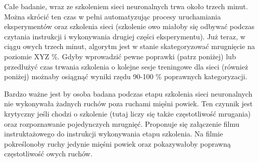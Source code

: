 \documentclass{article}
\begin{document}
        Całe badanie, wraz ze szkoleniem sieci neuronalnych trwa około trzech minut. Można skrócić ten czas w pełni automatyzując procesy uruchamiania eksperymentów oraz szkolenia sieci (szkolenie owo miałoby się odbywać podczas czytania instrukcji i wykonywania drugiej części eksperymentu). Już teraz, w ciągu owych trzech minut, algorytm jest w stanie skategoryzować mrugnięcie na poziomie XYZ \%. Gdyby wprowadzić pewne poprawki (patrz poniżej) lub przedłużyć czas trwania szkolenia o kolejne sesje treningowe dla sieci (również poniżej) możnaby osiągnąć wyniki rzędu 90-100 \% poprawnych kategoryzacji.

        Bardzo ważne jest by osoba badana podczas etapu szkolenia sieci neuronalnych nie wykonywała żadnych ruchów poza ruchami mięśni powiek. Ten czynnik jest krytyczny jeśli chodzi o szkolenie (tutaj liczy się także częstotliwość mrugania) oraz rozpoznawanie pojedynczych mrugnięć. Proponuje się załączenie filmu instruktażowego do instrukcji wykonywania etapu szkolenia. Na filmie pokreślonoby ruchy jedynie mięśni powiek oraz pokazywałoby poprawną częstotliwość owych ruchów.
\end{document}
